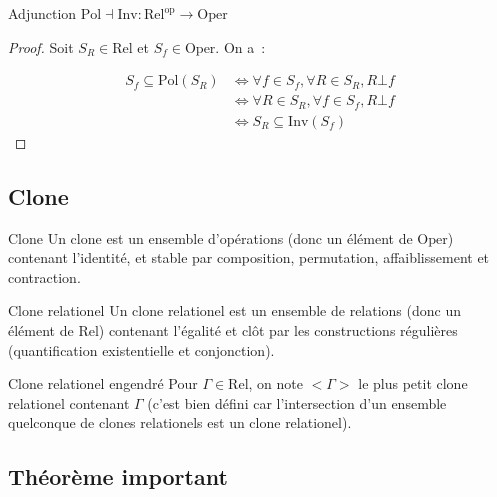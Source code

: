 \documentclass[12pt]{article}
\newcommand\Rel{\text{Rel}}
\newcommand\Oper{\text{Oper}}
\newcommand\Inv{\text{Inv}}
\newcommand\Pol{\text{Pol}}
\begin{document}
\begin{theo}{Adjunction}
    $\Pol\dashv\Inv : \Rel^\text{op} \rightarrow \Oper$
\end{theo}
\begin{proof}
    Soit $S_R\in\Rel$ et $S_f\in\Oper$. On a~:

    \begin{align*}
        S_f\subseteq\Pol(S_R) &\iff \forall f\in S_f, \forall R\in S_R, R\bot f \\
                              &\iff \forall R\in S_R, \forall f\in S_f, R\bot f \\
                              &\iff S_R\subseteq\Inv(S_f)
    \end{align*}
\end{proof}

\subsection{Clone}

\begin{defi}{Clone} Un clone est un ensemble d'opérations (donc un élément de $\Oper$)
    contenant l'identité, et stable par composition, permutation, affaiblissement et
    contraction.
\end{defi}

\begin{defi}{Clone relationel} Un clone relationel est un ensemble de relations
    (donc un élément de $\Rel$) contenant l'égalité et clôt par les constructions
    régulières (quantification existentielle et conjonction).
\end{defi}

\begin{defi}{Clone relationel engendré} Pour $\Gamma\in\Rel$, on note $<\Gamma>$ le plus
    petit clone relationel contenant $\Gamma$ (c'est bien défini car l'intersection d'un
    ensemble quelconque de clones relationels est un clone relationel).
\end{defi}

\subsection{Théorème important}
\end{document}
